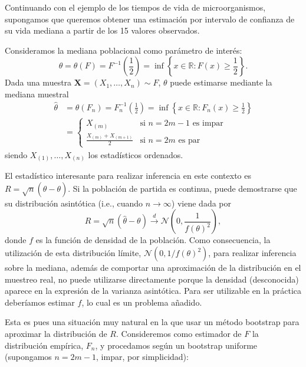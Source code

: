 \documentclass[]{book}
\theoremstyle{break}
\theoremstyle{definition}
\theoremstyle{definition}
\theoremstyle{definition}
\theoremstyle{remark}
\let\BeginKnitrBlock\begin \let\EndKnitrBlock\end
\begin{document}
\BeginKnitrBlock{example}[Inferencia sobre la mediana]
\protect\hypertarget{exm:mediana}{}{\label{exm:mediana} \iffalse (Inferencia
sobre la mediana) \fi{} } \vspace{0.5cm}

Continuando con el ejemplo de los tiempos de vida de microorganismos,
supongamos que queremos obtener una estimación por intervalo de
confianza de su vida mediana a partir de los 15 valores observados.
\EndKnitrBlock{example}

Consideramos la mediana poblacional como parámetro de interés:
\[\theta = \theta \left( F \right) = F^{-1}\left( \frac{1}{2} \right) 
= \inf \left\{ x\in \mathbb{R} : F\left( x \right) \geq \frac{1}{2}\right\}.\]
Dada una muestra \(\mathbf{X}=\left( X_1,\ldots ,X_n \right) \sim F\),
\(\theta\) puede estimarse mediante la mediana muestral
\[\begin{aligned}
\hat{\theta} &= \theta \left( F_n \right) =F_n^{-1}\left( \frac{1}{2} \right) 
=\inf \left\{ x\in \mathbb{R} : F_n\left( x \right) \geq \frac{1}{2}
\right\} \\
&= \left\{ 
\begin{array}{ll}
X_{(m)} & \text{si } n=2m-1 \text{ es impar} \\ 
\frac{X_{(m)}+X_{\left( m+1 \right)}}{2} & \text{si } n=2m \text{ es par}
\end{array}
\right.
\end{aligned}\] siendo \(X_{(1)},\ldots ,X_{(n)}\) los estadísticos
ordenados.

El estadístico interesante para realizar inferencia en este contexto es
\(R=\sqrt{n}\left( \hat{\theta}-\theta \right)\). Si la población de
partida es continua, puede demostrarse que su distribución asintótica
(i.e., cuando \(n \rightarrow \infty\)) viene dada por
\[R=\sqrt{n}\left( \hat{\theta}-\theta \right) \overset{d}{\rightarrow }
\mathcal{N}\left( 0,\frac{1}{f\left( \theta \right)^2} \right),\]donde
\(f\) es la función de densidad de la población. Como consecuencia, la
utilización de esta distribución límite,
\(\mathcal{N}\left( 0, 1/f\left( \theta \right)^2 \right)\), para
realizar inferencia sobre la mediana, además de comportar una
aproximación de la distribución en el muestreo real, no puede utilizarse
directamente porque la densidad (desconocida) aparece en la expresión de
la varianza asintótica. Para ser utilizable en la práctica deberíamos
estimar \(f\), lo cual es un problema añadido.

Esta es pues una situación muy natural en la que usar un método
bootstrap para aproximar la distribución de \(R\). Consideremos como
estimador de \(F\) la distribución empírica, \(F_n\), y procedamos según
un bootstrap uniforme (supongamos \(n=2m-1\), impar, por simplicidad):
\end{document}
